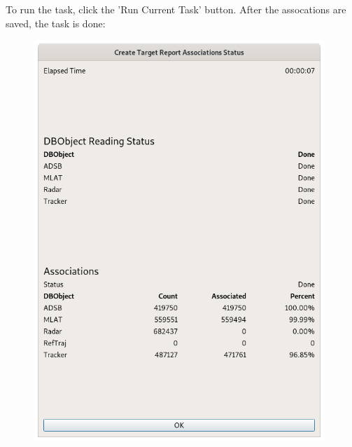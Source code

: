 To run the task, click the 'Run Current Task' button. After the assocations are saved, the task is done:

\begin{figure}[H]
  \center
    \includegraphics[width=11cm]{figures/tr_association_done.png}
\end{figure}
